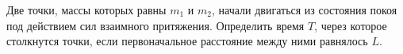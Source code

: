 Две точки, массы которых равны $m_1$ и $m_2$, начали двигаться 
из состояния покоя под действием сил взаимного притяжения. Определить
время $T$, через которое столкнутся точки, если первоначальное
расстояние между ними равнялось $L$.
